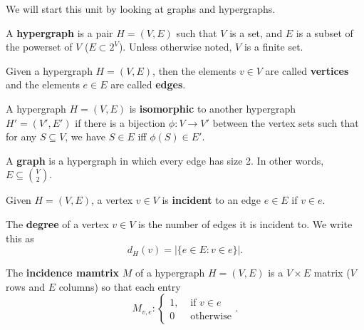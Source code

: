 
We will start this unit by looking at graphs and hypergraphs.

\begin{definition}
	A \textbf{hypergraph} is a pair \( H=(V,E) \) such that \( V \) is a set, and \( E  \) is a subset of the powerset of \( V \) (\( E \subset 2^{V}  \)). Unless otherwise noted, \( V \) is a finite set.
\end{definition}

\begin{definition}
	Given a hypergraph \( H=(V,E) \), then the elements \( v \in V \) are called \textbf{vertices} and the elements \( e \in E \) are called \textbf{edges}.
\end{definition}

\begin{definition}
	A hypergraph \( H=(V,E) \) is \textbf{isomorphic} to another hypergraph \( H'=(V',E') \) if there is a bijection \( \phi : V\to V' \) between the vertex sets such that for any \( S \subseteq V \), we have \( S \in E \) iff \( \phi(S) \in E' \).
\end{definition}

\begin{definition}
	A \textbf{graph} is a hypergraph in which every edge has size 2. In other words, \( E \subseteq \binom{V}{2} \).
\end{definition}

\begin{definition}
	Given \( H=(V,E) \), a vertex \( v\in V \) is \textbf{incident} to an edge \( e \in E \) if \( v \in e \).
\end{definition}

\begin{definition}
	The \textbf{degree} of a vertex \( v \in V \) is the number of edges it is incident to. We write this as \[
		d_H(v) = |\{e \in E: v \in e\}|
	.\] 
\end{definition}

\begin{definition}
	The \textbf{incidence mamtrix} \( M \) of a hypergraph \( H=(V,E) \) is a \( V\times E \) matrix (\( V \) rows and \( E  \) columns) so that each entry \[
		M_{v,e} : \begin{cases}
			1, &\text{ if } v \in e\\
			0 &\text{ otherwise}
		\end{cases}
	.\] 
\end{definition}

